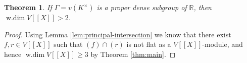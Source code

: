 \documentclass[12pt]{amsart}
\newtheorem{theorem}{Theorem}[section]
\theoremstyle{plain}
\newcommand{\wdim}{\operatorname{w.dim}}
\begin{document}
\begin{theorem}\label{thm:main'}
If $\Gamma=v(K^\times)$ is a proper dense subgroup of $\mathbb{R}$, then $\wdim V[[X]]>2$.
\end{theorem}

\begin{proof}

Using Lemma \ref{lem:principal-intersection} we know that there exist $f,r\in V[[X]]$ such that $(f)\cap (r)$ is not flat as a $V[[X]]$-module, and hence $\wdim V[[X]]\geq 3$ by Theorem \ref{thm:main}.\qedhere %

\end{proof}
\end{document}
